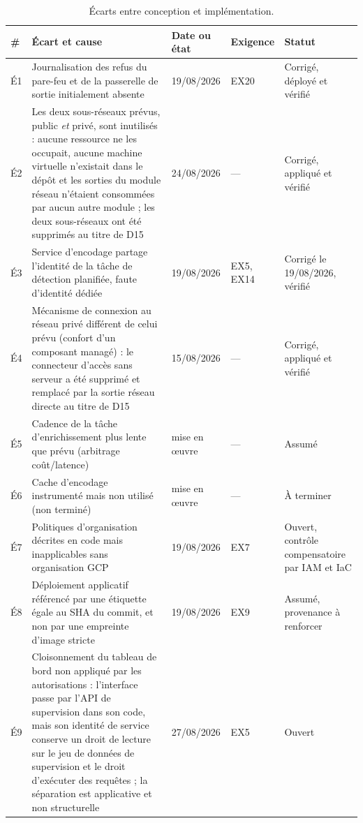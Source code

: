 \begin{table}[htbp]
\caption{Écarts entre conception et implémentation.}
\label{tab:ecarts-implementation}
\centering
\footnotesize
\setlength{\tabcolsep}{3.5pt}
\renewcommand{\arraystretch}{1.05}
\begin{tabular}{|P{0.75cm}|P{7.70cm}|P{1.95cm}|P{1.85cm}|P{2.34cm}|}
\hline
\# & Écart et cause & Date ou état & Exigence & Statut \\
\hline
É1 & Journalisation des refus du pare-feu et de la passerelle de sortie initialement absente &
19/08/2026 & EX20 & Corrigé, déployé et vérifié \\ \hline
É2 & Les deux sous-réseaux prévus, public \emph{et} privé, sont inutilisés : aucune ressource ne
les occupait, aucune machine virtuelle n'existait dans le dépôt et les sorties du module réseau
n'étaient consommées par aucun autre module ; les deux sous-réseaux ont été supprimés au titre de
D15 & 24/08/2026 & --- & Corrigé, appliqué et vérifié \\ \hline
É3 & Service d'encodage partage l'identité de la tâche de détection planifiée, faute d'identité
dédiée & 19/08/2026 & EX5, EX14 & Corrigé le 19/08/2026, vérifié \\ \hline
É4 & Mécanisme de connexion au réseau privé différent de celui prévu (confort d'un composant
managé) : le connecteur d'accès sans serveur a été supprimé et remplacé par la sortie réseau
directe au titre de D15 & 15/08/2026 & --- & Corrigé, appliqué et vérifié \\ \hline
É5 & Cadence de la tâche d'enrichissement plus lente que prévu (arbitrage coût/latence) & mise
en œuvre & --- & Assumé \\ \hline
É6 & Cache d'encodage instrumenté mais non utilisé (non terminé) & mise en œuvre & --- &
À terminer \\ \hline
É7 & Politiques d'organisation décrites en code mais inapplicables sans organisation GCP &
19/08/2026 & EX7 & Ouvert, contrôle compensatoire par IAM et IaC \\ \hline
É8 & Déploiement applicatif référencé par une étiquette égale au SHA du commit, et non par une
empreinte d'image stricte & 19/08/2026 & EX9 & Assumé, provenance à renforcer \\ \hline
É9 & Cloisonnement du tableau de bord non appliqué par les autorisations : l'interface passe par
l'API de supervision dans son code, mais son identité de service conserve un droit de lecture sur
le jeu de données de supervision et le droit d'exécuter des requêtes ; la séparation est
applicative et non structurelle & 27/08/2026 & EX5 & Ouvert \\ \hline

\end{tabular}
\end{table}
